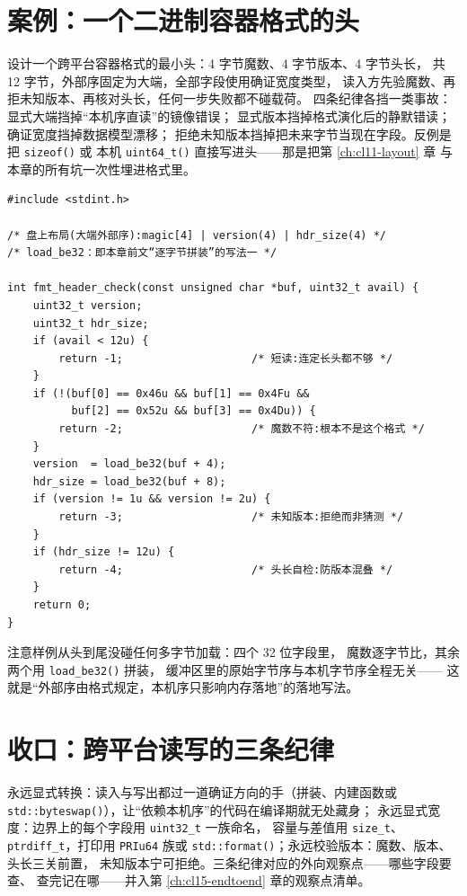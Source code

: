 \documentclass[12pt,a4paper,fontset=fandol]{ctexbook}
\newcommand{\Fn}[1]{\texttt{#1()}}
\newcommand{\Tp}[1]{\texttt{#1}}
\begin{document}
\section{案例：一个二进制容器格式的头}\label{sec:cl12-container}

\begin{abibox}[title={容器格式设计：把字节序与宽度写进合同}]
设计一个跨平台容器格式的最小头：4 字节魔数、4 字节版本、4 字节头长，
共 12 字节，外部序固定为大端，全部字段使用确证宽度类型，
读入方先验魔数、再拒未知版本、再核对头长，任何一步失败都不碰载荷。
四条纪律各挡一类事故：显式大端挡掉“本机序直读”的镜像错误；
显式版本挡掉格式演化后的静默错读；确证宽度挡掉数据模型漂移；
拒绝未知版本挡掉把未来字节当现在字段。反例是把 \Fn{sizeof} 或
本机 \Fn{uint64\_t} 直接写进头——那是把第 \ref{ch:cl11-layout} 章
与本章的所有坑一次性埋进格式里。
\end{abibox}

\begin{lstlisting}[style=cstyle, caption={容器头：逐字节读入与三重校验（示意格式）}]
#include <stdint.h>

/* 盘上布局(大端外部序):magic[4] | version(4) | hdr_size(4) */
/* load_be32：即本章前文“逐字节拼装”的写法一 */

int fmt_header_check(const unsigned char *buf, uint32_t avail) {
    uint32_t version;
    uint32_t hdr_size;
    if (avail < 12u) {
        return -1;                    /* 短读:连定长头都不够 */
    }
    if (!(buf[0] == 0x46u && buf[1] == 0x4Fu &&
          buf[2] == 0x52u && buf[3] == 0x4Du)) {
        return -2;                    /* 魔数不符:根本不是这个格式 */
    }
    version  = load_be32(buf + 4);
    hdr_size = load_be32(buf + 8);
    if (version != 1u && version != 2u) {
        return -3;                    /* 未知版本:拒绝而非猜测 */
    }
    if (hdr_size != 12u) {
        return -4;                    /* 头长自检:防版本混叠 */
    }
    return 0;
}
\end{lstlisting}

注意样例从头到尾没碰任何多字节加载：四个 32 位字段里，
魔数逐字节比，其余两个用 \Fn{load\_be32} 拼装，
缓冲区里的原始字节序与本机字节序全程无关——
这就是“外部序由格式规定，本机序只影响内存落地”的落地写法。

\section{收口：跨平台读写的三条纪律}\label{sec:cl12-closing}

\begin{bestpractice}[title={外部格式读写三纪律}]
永远显式转换：读入与写出都过一道确证方向的手（拼装、内建函数或
\Fn{std::byteswap}），让“依赖本机序”的代码在编译期就无处藏身；
永远显式宽度：边界上的每个字段用 \Tp{uint32\_t} 一族命名，
容量与差值用 \Tp{size\_t}、\Tp{ptrdiff\_t}，打印用 \Tp{PRIu64} 族或
\Fn{std::format}；永远校验版本：魔数、版本、头长三关前置，
未知版本宁可拒绝。三条纪律对应的外向观察点——哪些字段要查、
查完记在哪——并入第 \ref{ch:cl15-endtoend} 章的观察点清单。
\end{bestpractice}
\end{document}
